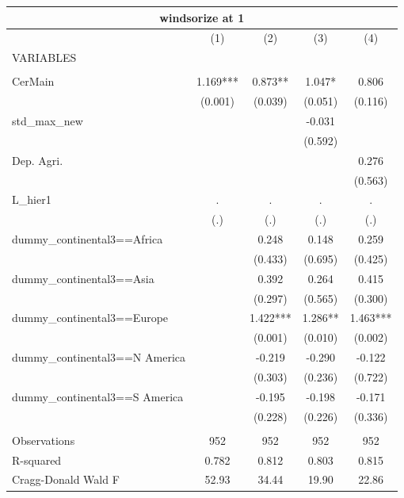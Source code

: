 \documentclass[12pt,a4paper]{article}
\begin{document}
\begin{tabular}{lcccc}
\multicolumn{5}{c}{windsorize at 1} \\ \hline
 & (1) & (2) & (3) & (4) \\
VARIABLES &  &  &  &  \\ \hline
 &  &  &  &  \\
CerMain & 1.169*** & 0.873** & 1.047* & 0.806 \\
 & (0.001) & (0.039) & (0.051) & (0.116) \\
std\_max\_new &  &  & -0.031 &  \\
 &  &  & (0.592) &  \\
Dep. Agri. &  &  &  & 0.276 \\
 &  &  &  & (0.563) \\
L\_hier1 & . & . & . & . \\
 & (.) & (.) & (.) & (.) \\
dummy\_continental3==Africa &  & 0.248 & 0.148 & 0.259 \\
 &  & (0.433) & (0.695) & (0.425) \\
dummy\_continental3==Asia &  & 0.392 & 0.264 & 0.415 \\
 &  & (0.297) & (0.565) & (0.300) \\
dummy\_continental3==Europe &  & 1.422*** & 1.286** & 1.463*** \\
 &  & (0.001) & (0.010) & (0.002) \\
dummy\_continental3==N America &  & -0.219 & -0.290 & -0.122 \\
 &  & (0.303) & (0.236) & (0.722) \\
dummy\_continental3==S America &  & -0.195 & -0.198 & -0.171 \\
 &  & (0.228) & (0.226) & (0.336) \\
 &  &  &  &  \\
Observations & 952 & 952 & 952 & 952 \\
R-squared & 0.782 & 0.812 & 0.803 & 0.815 \\
 Cragg-Donald Wald F & 52.93 & 34.44 & 19.90 & 22.86 \\ \hline
\end{tabular}
\end{document}
